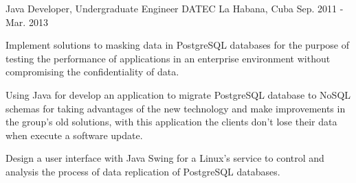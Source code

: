 \begin{cventries}

\cventry
{Java Developer, Undergraduate Engineer} %
{DATEC} %
{La Habana, Cuba} %
{Sep. 2011 - Mar. 2013} %
{ %
\begin{cvitems}
\item {Implement solutions to masking data in PostgreSQL databases for the purpose of testing the performance of applications in an enterprise environment without compromising the confidentiality of data.}
\item {Using Java for develop an application to migrate PostgreSQL database to NoSQL schemas for taking advantages of the new technology and make improvements in the group's old solutions, with this application the clients don't lose their data when execute a software update.}
\item {Design a user interface with Java Swing for a Linux's service to control and analysis the process of data replication of PostgreSQL databases.}
\end{cvitems} 
}
\end{cventries}